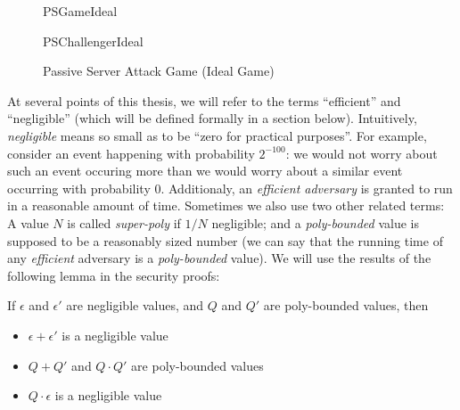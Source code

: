 \begin{figure}[!h]
  \centering
  \begin{center}
    \begin{bbrenv}{PSGameIdeal}
      \begin{bbrbox}[name=Adversary, minheight=2cm]
        
      \end{bbrbox}
      \begin{bbrchallenger}{PSChallengerIdeal}
        \begin{bbrbox}[name=Challenger]
        \end{bbrbox}
      \end{bbrchallenger}
    \end{bbrenv}
  \end{center}
  \caption{Passive Server Attack Game (Ideal Game)}
  \label{fig:passiveServerGameIdeal}
\end{figure}

At several points of this thesis, we will refer to the terms ``efficient'' and
``negligible'' (which will be defined formally in a section below). Intuitively,
\textit{negligible} means so small as to be ``zero for practical purposes''. For
example, consider an event happening with probability \(2^{-100}\): we would
not worry about such an event occuring more than we would worry about a similar
event occurring with probability 0. Additionaly, an \textit{efficient
  adversary} is granted to run in a reasonable amount of time. Sometimes we
also use two other related terms: A value \(N\) is called \textit{super-poly} if
\(1/N\) negligible; and a \textit{poly-bounded} value is supposed to be a reasonably sized
number (we can say that the running time of any \textit{efficient} adversary is
a \textit{poly-bounded} value). We will use the results of the following lemma in
the security proofs:
\begin{lemma}
  If \(\epsilon\) and \(\epsilon'\) are negligible values, and \(Q\) and \(Q'\)
  are poly-bounded values, then
  \begin{itemize}
  \item \(\epsilon + \epsilon'\) is a negligible value
  \item \(Q + Q'\) and \(Q \cdot Q'\) are poly-bounded values
  \item \(Q \cdot \epsilon\) is a negligible value
  \end{itemize}
\end{lemma}

